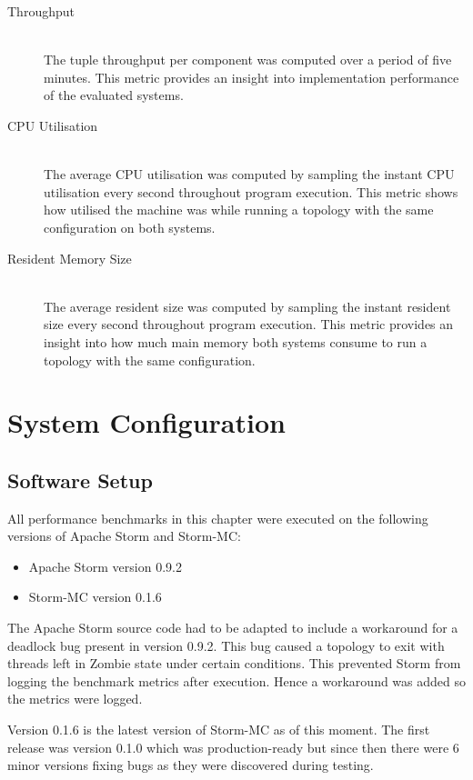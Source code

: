 \documentclass[bsc,deptreport,twoside,singlespacing,normalheadings,parskip]{infthesis}\usepackage[]{graphicx}\usepackage[]{color}
\begin{document}
\begin{description}
	\item[Throughput] \hfill \\
	The tuple throughput per component was computed over a period of five minutes. This metric provides an insight into implementation performance of the evaluated systems.
	\item[CPU Utilisation] \hfill \\
	The average CPU utilisation was computed by sampling the instant CPU utilisation every second throughout program execution. This metric shows how utilised the machine was while running a topology with the same configuration on both systems.
	\item[Resident Memory Size] \hfill \\
	The average resident size was computed by sampling the instant resident size every second throughout program execution. This metric provides an insight into how much main memory both systems consume to run a topology with the same configuration.
\end{description}

\section{System Configuration}
\label{sec:system_conf}

\subsection{Software Setup}

All performance benchmarks in this chapter were executed on the following versions of Apache Storm and Storm-MC:

\begin{itemize}
	\item Apache Storm version 0.9.2
	\item Storm-MC version 0.1.6
\end{itemize}

The Apache Storm source code had to be adapted to include a workaround for a deadlock bug present in version 0.9.2. This bug caused a topology to exit with threads left in Zombie state under certain conditions. This prevented Storm from logging the benchmark metrics after execution. Hence a workaround was added so the metrics were logged.

Version 0.1.6 is the latest version of Storm-MC as of this moment. The first release was version 0.1.0 which was production-ready but since then there were 6 minor versions fixing bugs as they were discovered during testing.
\end{document}
